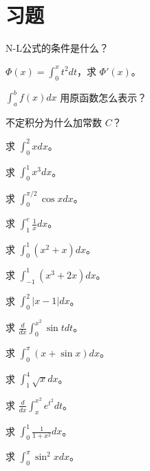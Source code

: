 \section{习题}
\begin{exercise}[0] N-L公式的条件是什么？\end{exercise}
\begin{exercise}[0] \(\Phi(x)=\int_0^x t^2 dt\)，求 \(\Phi'(x)\)。\end{exercise}
\begin{exercise}[0] \(\int_a^b f(x)dx\) 用原函数怎么表示？\end{exercise}
\begin{exercise}[0] 不定积分为什么加常数 \(C\)？\end{exercise}
\begin{exercise}[1] 求 \(\int_0^2 x dx\)。\end{exercise}
\begin{exercise}[1] 求 \(\int_0^1 x^3 dx\)。\end{exercise}
\begin{exercise}[1] 求 \(\int_0^{\pi/2} \cos x dx\)。\end{exercise}
\begin{exercise}[1] 求 \(\int_1^e \frac1x dx\)。\end{exercise}
\begin{exercise}[2] 求 \(\int_0^1 (x^2+x) dx\)。\end{exercise}
\begin{exercise}[2] 求 \(\int_{-1}^1 (x^3+2x) dx\)。\end{exercise}
\begin{exercise}[2] 求 \(\int_0^2 |x-1| dx\)。\end{exercise}
\begin{exercise}[2] 求 \(\frac{d}{dx}\int_0^{x^2} \sin t dt\)。\end{exercise}
\begin{exercise}[3] 求 \(\int_0^{\pi} (x+\sin x) dx\)。\end{exercise}
\begin{exercise}[3] 求 \(\int_1^4 \sqrt{x} dx\)。\end{exercise}
\begin{exercise}[3] 求 \(\frac{d}{dx}\int_x^{x^2} e^{t^2} dt\)。\end{exercise}
\begin{exercise}[3] 求 \(\int_0^1 \frac{1}{1+x^2} dx\)。\end{exercise}
\begin{exercise}[3] 求 \(\int_0^{\pi} \sin^2 x dx\)。\end{exercise}
